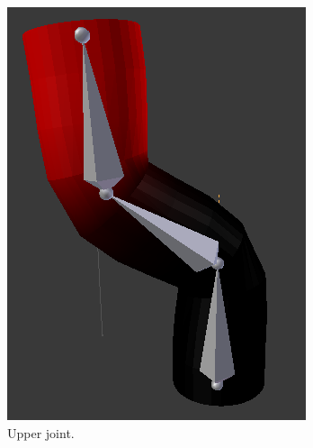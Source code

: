 \begin{figure}[H]
\begin{subfigure}{0.25\linewidth}
                \includegraphics[width=1\linewidth]{wonky_pole/upper_bone}
                \caption{Upper joint.}
            \end{subfigure}%
            \begin{subfigure}{0.25\linewidth}
            \centering

\end{subfigure}
\end{figure}
